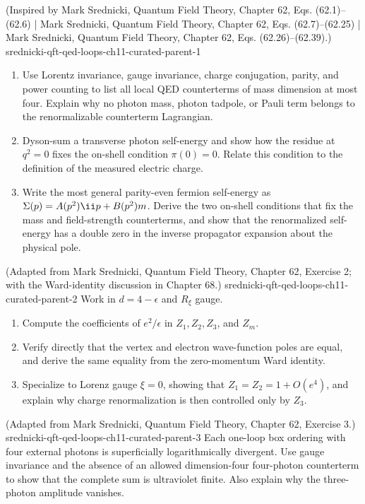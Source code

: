 \begin{enumerate}
  {(Inspired by Mark Srednicki, Quantum Field Theory, Chapter 62, Eqs. (62.1)--(62.6) | Mark Srednicki, Quantum Field Theory, Chapter 62, Eqs. (62.7)--(62.25) | Mark Srednicki, Quantum Field Theory, Chapter 62, Eqs. (62.26)--(62.39).)}
  {srednicki-qft-qed-loops-ch11-curated-parent-1}
\begin{enumerate}
\item
Use Lorentz invariance, gauge invariance, charge conjugation, parity, and
power counting to list all local QED counterterms of mass dimension at most
four.  Explain why no photon mass, photon tadpole, or Pauli term belongs to
the renormalizable counterterm Lagrangian.
\item
Dyson-sum a transverse photon self-energy and show how the residue at
\(q^2=0\) fixes the on-shell condition \(\pi(0)=0\).  Relate this condition
to the definition of the measured electric charge.
\item
Write the most general parity-even fermion self-energy as
\(\Sigma(p)=A(p^2)\ii\sl p+B(p^2)m\).  Derive the two on-shell conditions that
fix the mass and field-strength counterterms, and show that the renormalized
self-energy has a double zero in the inverse propagator expansion about the
physical pole.
\end{enumerate}

  {(Adapted from Mark Srednicki, Quantum Field Theory, Chapter 62, Exercise 2; with the Ward-identity discussion in Chapter 68.)}
  {srednicki-qft-qed-loops-ch11-curated-parent-2}
Work in \(d=4-\epsilon\) and \(R_\xi\) gauge.
\begin{enumerate}
\item Compute the coefficients of \(e^2/\epsilon\) in
\(Z_1,Z_2,Z_3\), and \(Z_m\).
\item Verify directly that the vertex and electron wave-function poles
are equal, and derive the same equality from the zero-momentum Ward
identity.
\item Specialize to Lorenz gauge \(\xi=0\), showing that
\(Z_1=Z_2=1+O(e^4)\), and explain why charge renormalization is then
controlled only by \(Z_3\).
\end{enumerate}

  {(Adapted from Mark Srednicki, Quantum Field Theory, Chapter 62, Exercise 3.)}
  {srednicki-qft-qed-loops-ch11-curated-parent-3}
Each one-loop box ordering with four external photons is superficially
logarithmically divergent.  Use gauge invariance and the absence of an
allowed dimension-four four-photon counterterm to show that the complete
sum is ultraviolet finite.  Also explain why the three-photon amplitude
vanishes.


\end{enumerate}
